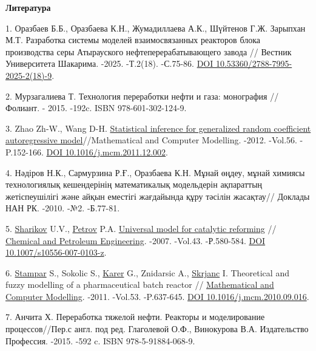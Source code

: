 \begin{center}
{\bfseries Литература}
\end{center}

\begin{refs}
1. Оразбаев Б.Б., Оразбаева К.Н., Жумадиллаева А.К., Шүйтенов Г.Ж.
Зарыпхан М.Т. Разработка системы моделей взаимосвязанных реакторов
блока производства серы Атырауского нефтеперерабатывающего завода //
Вестник Университета Шакарима. -2025. -Т.2(18). -С.75-86.
\href{https://doi.org/10.53360/2788-7995-2025-2(18)-9}{DOI
10.53360/2788-7995-2025-2(18)-9}.

2. Мурзагалиева Т. Технология переработки нефти и газа: монография //
Фолиант. - 2015. -192c. ISBN 978-601-302-124-9.

3. Zhao Zh-W., Wang D-H.
\href{http://www.sciencedirect.com/science/article/pii/S0895717711007655}{Statistical
inference for generalized random coefficient autoregressive
model}//Mathematical and Computer Modelling. -2012. -Vol.56.
-P.152-166. \href{https://doi.org/10.1016/j.mcm.2011.12.002}{DOI
10.1016/j.mcm.2011.12.002}.

4. Нәдіров Н.К., Сармурзина Р.Ғ., Оразбаева К.Н. Мұнай өңдеу, мұнай
химиясы технологиялық кешендерінің математикалық модельдерін
ақпараттың жетіспеушілігі және айқын еместігі жағдайында құру тәсілін
жасақтау// Доклады НАН РК. -2010. -№2. -Б.77-81.

5. \href{http://www.springerlink.com/content/?Author=Yu.+V.+Sharikov}{Sharikov}
U.V.,
\href{http://www.springerlink.com/content/?Author=P.+A.+Petrov}{Petrov}
P.A.
\href{http://www.springerlink.com/content/br0wn2h316r1v65x/}{Universal
model for catalytic reforming} //
\href{http://www.springerlink.com/content/0009-2355/}{Chemical and
Petroleum Engineering}. -2007. -Vol.43. -Р.580-584.
\href{https://doi.org/10.1007/s10556-007-0103-z}{DOI
10.1007/s10556-007-0103-z}.

6. \href{http://www.sciencedirect.com/science/article/pii/S0895717710004474}{Stampar}
S., Sokolic S.,
\href{http://www.sciencedirect.com/science/article/pii/S0895717710004474}{Karer}
G., Znidarsic A.,
\href{http://www.sciencedirect.com/science/article/pii/S0895717710004474}{Skrjanc}
I. Theoretical and fuzzy modelling of a pharmaceutical batch reactor
//
\href{http://www.sciencedirect.com/science/journal/08957177}{Mathematical
and Computer Modelling}. -2011. -Vol.53. -P.637-645.
\href{https://doi.org/10.1016/j.mcm.2010.09.016}{DOI
10.1016/j.mcm.2010.09.016}.

7. Анчита Х. Переработка тяжелой нефти. Реакторы и моделирование
процессов//Пер.с англ. под ред. Глаголевой О.Ф., Винокурова В.А.
Издательство Профессия. -2015. -592 c. ISBN 978-5-91884-068-9.


\end{refs}

